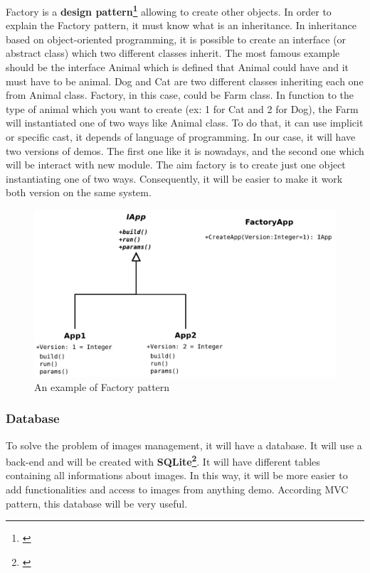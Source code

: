 Factory is a \textbf{design pattern\footnote{\cite{GoF}}} allowing to create other objects.
In order to explain the Factory pattern, it must know what is an inheritance.
In inheritance based on object-oriented
programming, it is possible to create an interface (or abstract class) which two different
classes inherit. The most famous example should be the interface Animal which is defined that
Animal could have and it must have to be animal. Dog and Cat are two different classes
inheriting each one from Animal class.
Factory, in this case, could be Farm class. In function to the type of animal which you want
to create (ex: 1 for Cat and 2 for Dog), the Farm will instantiated one of two ways like
Animal class. To do that, it can use implicit or specific cast, it depends of language of
programming.
\bigbreak
\setlength{\parindent}{0cm}
In our case, it will have two versions of demos. The first one like it is nowadays, and the
second one which will be interact with new module. The aim factory is to create just one
object instantiating one of two ways. Consequently, it will be easier to make it work both
version on the same system.

\begin{figure}[H]
  \centering
  \includegraphics[width=5in]{blobs/images/Example_Factory_Pattern}
  \caption{An example of Factory pattern}
  \label{img:Example_Factory_Pattern}
\end{figure}

\subsubsection{Database}

To solve the problem of images management, it will have a database. It will use a
back-end and will be created with \textbf{SQLite\footnote{\cite{SQLite}}}.
It will have different tables
containing all informations about images. In this way, it will be more easier to
add functionalities and access to images from anything demo. According MVC pattern,
this database will be very useful.\\

